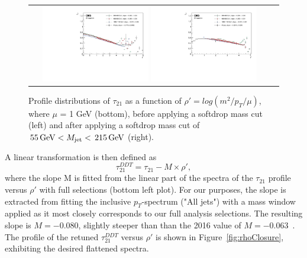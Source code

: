\begin{figure}[h!]
\centering
\begin{tabular}{cc}
\includegraphics[width=0.45\textwidth]{figures/analysis/search3/AN-17-303/vtag/rho_pythia_rhoPrime.pdf}
\includegraphics[width=0.45\textwidth]{figures/analysis/search3/AN-17-303/vtag/rho_pythia_FullSel_rhoPrime.pdf}\\
\end{tabular}
\caption{Profile distributions of $\tau_{21}$ as a function of $\rho' = log(m^2/p_T/\mu)$, where $\mu$ = 1 GeV (bottom), before applying a softdrop mass cut (left) and after applying a softdrop mass cut of $\text{\,55}{\ensuremath{\,\text{Ge\hspace{-.08em}V}}} < M_{\rm jet} < \text{\,215}{\ensuremath{\,\text{Ge\hspace{-.08em}V}}}$ (right).}
\label{fig:rho}
\end{figure}
A linear transformation is then defined as
\begin{equation}
\label{eq:ddt}
\tau_{21}^{DDT}=\tau_{21}-M\times\rho',
\end{equation}
where the slope M is fitted from the linear part of the spectra of the $\tau_{21}$ profile versus $\rho'$ with full selections (bottom left plot). For our purposes, the slope is extracted from fitting the inclusive $p_T$-spectrum ("All jets") with a mass window applied
as it most closely corresponds to our full analysis selections. The resulting slope is $\ensuremath{M} = -0.080$, slightly steeper than than the 2016 value of $\ensuremath{M} = -0.063$~\cite{JME-16-003}.
The profile of the retuned $\tau_{21}^{DDT}$ versus $\rho'$ is shown in Figure~\ref{fig:rhoClosure}, exhibiting the desired flattened spectra.
